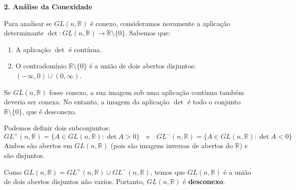 {	\textbf{2. Análise da Conexidade}
	
	Para analisar se $GL(n, \mathbb{R})$ é conexo, consideramos novamente a aplicação determinante $\det: GL(n, \mathbb{R}) \to \mathbb{R} \setminus \{0\}$. Sabemos que:
	\begin{enumerate}[label=(\roman*)]
		\item A aplicação $\det$ é contínua.
		\item O contradomínio $\mathbb{R} \setminus \{0\}$ é a união de dois abertos disjuntos: $(-\infty, 0) \cup (0, \infty)$.
	\end{enumerate}
	Se $GL(n, \mathbb{R})$ fosse conexo, a sua imagem sob uma aplicação contínua também deveria ser conexa. No entanto, a imagem da aplicação $\det$ é todo o conjunto $\mathbb{R} \setminus \{0\}$, que é desconexo. 
	
	Podemos definir dois subconjuntos:
	\[ GL^+(n, \mathbb{R}) = \{ A \in GL(n, \mathbb{R}) : \det A > 0 \} \quad \text{e} \quad GL^-(n, \mathbb{R}) = \{ A \in GL(n, \mathbb{R}) : \det A < 0 \} \]
	Ambos são abertos em $GL(n, \mathbb{R})$ (pois são imagens inversas de abertos do $\mathbb{R}$) e são disjuntos. 
	
	Como $GL(n, \mathbb{R}) = GL^+(n, \mathbb{R}) \cup GL^-(n, \mathbb{R})$, temos que $GL(n, \mathbb{R})$ é a união de dois abertos disjuntos não vazios. Portanto, $GL(n, \mathbb{R})$ é \textbf{desconexo}.
}

